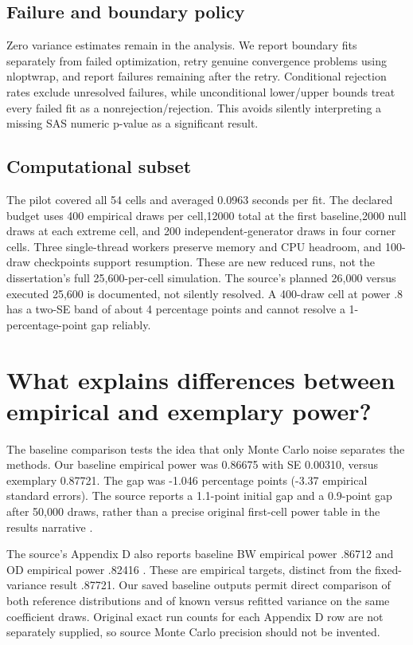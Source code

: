 \documentclass[11pt]{article}
\begin{document}
\subsection{Failure and boundary policy}
Zero variance estimates remain in the analysis. We report boundary fits separately from failed optimization, retry genuine convergence problems using nloptwrap, and report failures remaining after the retry. Conditional rejection rates exclude unresolved failures, while unconditional lower/upper bounds treat every failed fit as a nonrejection/rejection. This avoids silently interpreting a missing SAS numeric p-value as a significant result.
\subsection{Computational subset}
The pilot covered all 54 cells and averaged 0.0963 seconds per fit. The declared budget uses 400 empirical draws per cell,12000 total at the first baseline,2000 null draws at each extreme cell, and 200 independent-generator draws in four corner cells. Three single-thread workers preserve memory and CPU headroom, and 100-draw checkpoints support resumption. These are new reduced runs, not the dissertation's full 25,600-per-cell simulation. The source's planned 26,000 versus executed 25,600 is documented, not silently resolved. A 400-draw cell at power .8 has a two-SE band of about 4 percentage points and cannot resolve a 1-percentage-point gap reliably.
\section{What explains differences between empirical and exemplary power?}
The baseline comparison tests the idea that only Monte Carlo noise separates the methods. Our baseline empirical power was 0.86675 with SE 0.00310, versus exemplary 0.87721. The gap was -1.046 percentage points (-3.37 empirical standard errors). The source reports a 1.1-point initial gap and a 0.9-point gap after 50,000 draws, rather than a precise original first-cell power table in the results narrative \citep[pp.~85--90]{kupzyk2011}.

The source's Appendix D also reports baseline BW empirical power .86712 and OD empirical power .82416 \citep[Appendix D]{kupzyk2011}. These are empirical targets, distinct from the fixed-variance result .87721. Our saved baseline outputs permit direct comparison of both reference distributions and of known versus refitted variance on the same coefficient draws. Original exact run counts for each Appendix D row are not separately supplied, so source Monte Carlo precision should not be invented.
\end{document}
